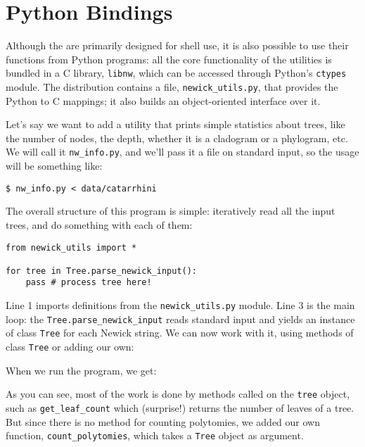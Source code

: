 
\chapter{Python Bindings}
\label{chap_python_lib}

Although the \nutils{} are primarily designed for shell use, it is also possible
to use their functions from Python programs: all the core functionality of the
utilities is bundled in a C library, \texttt{libnw}, which can be accessed
through Python's \texttt{ctypes} module. The distribution contains a file,
\texttt{newick\_utils.py}, that provides the Python to C mappings; it also
builds an object-oriented interface over it.

Let's say we want to add a utility that prints simple statistics about trees,
like the number of nodes, the depth, whether it is a cladogram or a phylogram,
etc. We will call it \texttt{nw\_info.py}, and we'll pass it a \nw{}
file on standard input, so the usage will be something like:

\begin{verbatim}
$ nw_info.py < data/catarrhini
\end{verbatim}

\noindent{}The overall structure of this program is simple: iteratively read
all the input trees, and do something with each of them:

\begin{lstlisting}
from newick_utils import *

for tree in Tree.parse_newick_input():
    pass # process tree here!
\end{lstlisting}

\noindent{}Line 1 imports definitions from the \texttt{newick\_utils.py}
module. Line 3 is the main loop: the \texttt{Tree.parse\_newick\_input}
reads standard input and yields an instance of class \texttt{Tree} for each
Newick string. We can now work with it, using methods of class \texttt{Tree} or adding our own:



\noindent{}When we run the program, we get:




As you can see, most of the work is done by methods called on the \texttt{tree}
object, such as \texttt{get\_leaf\_count} which (surprise!) returns the number
of leaves of a tree. But since there is no method for counting polytomies, we
added our own function, \texttt{count\_polytomies}, which takes a \texttt{Tree}
object as argument.

